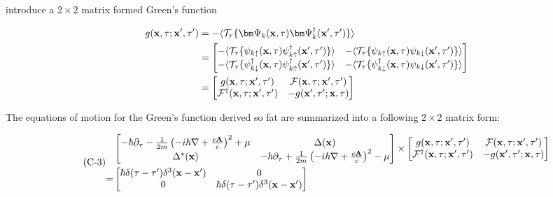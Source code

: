 introduce a $2\times2$ matrix formed Green's function

\[\begin{split}
{g}({\bf x},\tau;{\bf x'},\tau') &= -\langle\mathcal{T}_\tau\{\bm \Psi_k({\bf x},\tau)\bm\Psi_k^\dagger({\bf x'},\tau')\}\rangle\\
&=\left[\begin{matrix}
-\langle\mathcal{T}_\tau\{\psi_{k\uparrow}({\bf x},\tau)\psi_{k\uparrow}^\dagger({\bf x'},\tau')\}\rangle &- \langle\mathcal{T}_\tau\{\psi_{k\uparrow}({\bf x},\tau)\psi_{k\downarrow}({\bf x'},\tau')\}\rangle\\
-\langle\mathcal{T}_\tau\{\psi^\dagger_{k\downarrow}({\bf x},\tau)\psi^\dagger_{k\uparrow}({\bf x'},\tau')\}\rangle &- \langle\mathcal{T}_\tau\{\psi^\dagger_{k\downarrow}({\bf x},\tau)\psi_{k\downarrow}({\bf x'},\tau')\}\rangle
\end{matrix}\right]\\
&=\left[\begin{matrix}
g({\bf x},\tau;{\bf x'},\tau') &\mathcal{F}({\bf x},\tau;{\bf x'},\tau')\\
\mathcal{F}^\dagger({\bf x},\tau;{\bf x'},\tau')& -g({\bf x'},\tau';{\bf x},\tau)
\end{matrix}\right]
\end{split} \]

The equations of motion for the Green's function derived so fat are summarized into a following $2\times2$ matrix form:

\begin{align}\tag{C-3}
\begin{split}
&\left[\begin{matrix}
-\hbar\partial_\tau - \frac{1}{2m}\left(-i\hbar\nabla+\frac{e\bf A}{c}\right)^2+\mu &\Delta({\bf x})\\
\Delta^*({\bf x})& -\hbar\partial_\tau + \frac{1}{2m}\left(-i\hbar\nabla+\frac{e\bf A}{c}\right)^2-\mu
\end{matrix}\right] \times  \left[\begin{matrix}
g({\bf x},\tau;{\bf x'},\tau') &\mathcal{F}({\bf x},\tau;{\bf x'},\tau')\\
\mathcal{F}^\dagger({\bf x},\tau;{\bf x'},\tau')& -g({\bf x'},\tau';{\bf x},\tau)
\end{matrix}\right]\\
 = &\left[\begin{matrix}
\hbar\delta(\tau-\tau')\delta^3({\bf x-x'}) &0\\
0&\hbar\delta(\tau-\tau')\delta^3({\bf x-x'}) 
\end{matrix}\right]
\end{split}\end{align}

